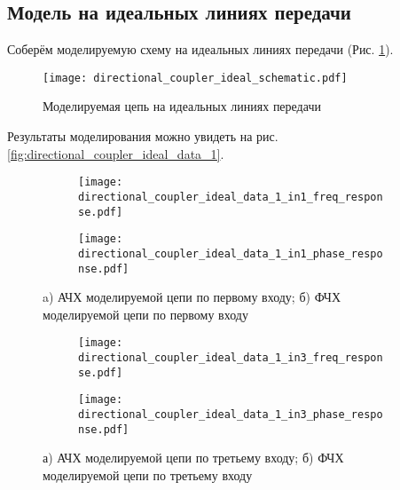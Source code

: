 \subsection{Модель на идеальных линиях передачи}

Соберём моделируемую схему на идеальных линиях передачи (Рис. \ref{fig:directional_coupler_ideal_schematic}).

\begin{figure}[!ht]
    \centering
    \texttt{[image: directional\_coupler\_ideal\_schematic.pdf]}
    \caption{Моделируемая цепь на идеальных линиях передачи}
    \label{fig:directional_coupler_ideal_schematic}
\end{figure}

Результаты моделирования можно увидеть на рис. \ref{fig:directional_coupler_ideal_data_1}.

\begin{figure}[!ht]
    \centering
    \begin{subfigure}[b]{0.40\textwidth}
        \centering
        \texttt{[image: directional\_coupler\_ideal\_data\_1\_in1\_freq\_response.pdf]}
        \caption{}
        \label{fig:directional_coupler_ideal_data_1_in1_freq_response}
    \end{subfigure}
    \hfill
    \begin{subfigure}[b]{0.40\textwidth}
        \centering
        \texttt{[image: directional\_coupler\_ideal\_data\_1\_in1\_phase\_response.pdf]}
        \caption{}
        \label{fig:directional_coupler_ideal_data_1_in1_phase_response}
    \end{subfigure}
    \caption{
        a) АЧХ моделируемой цепи по первому входу;
        б) ФЧХ моделируемой цепи по первому входу
    }
    \label{fig:directional_coupler_ideal_data_1_in1}
\end{figure}

\begin{figure}[!ht]
    \begin{subfigure}[b]{0.40\textwidth}
        \centering
        \texttt{[image: directional\_coupler\_ideal\_data\_1\_in3\_freq\_response.pdf]}
        \caption{}
        \label{fig:directional_coupler_ideal_data_1_in3_freq_response}
    \end{subfigure}
    \hfill
    \begin{subfigure}[b]{0.40\textwidth}
        \centering
        \texttt{[image: directional\_coupler\_ideal\_data\_1\_in3\_phase\_response.pdf]}
        \caption{}
        \label{fig:directional_coupler_ideal_data_1_in3_phase_response}
    \end{subfigure}
    \caption{
        а) АЧХ моделируемой цепи по третьему входу;
        б) ФЧХ моделируемой цепи по третьему входу
    }
    \label{fig:directional_coupler_ideal_data_1_in3}
\end{figure}

